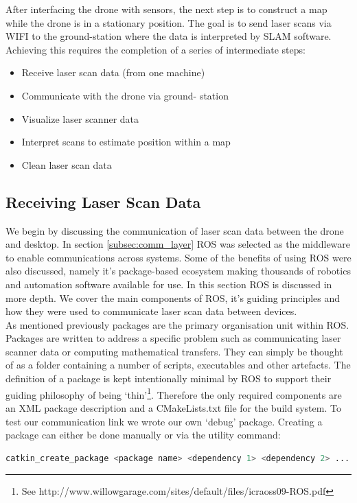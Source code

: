 \documentclass[capstone_report.tex]{subfiles}
\begin{document}
After interfacing the drone with sensors, the next step is to construct a map while the drone is in a stationary position.   The goal is to send laser scans via WIFI to the ground-station where the data is interpreted by SLAM software.  Achieving this requires the completion of a series of intermediate steps:

\begin{itemize}
    \item Receive laser scan data (from one machine)
    \item Communicate with the drone via ground- station
    \item Visualize laser scanner data
    \item Interpret scans to estimate position within a map
    \item Clean laser scan data
\end{itemize}

\subsection{Receiving Laser Scan Data}
We begin by discussing the communication of laser scan data between the drone and desktop.  In section \ref{subsec:comm_layer} ROS was selected as the middleware to enable communications across systems.   Some of the benefits of using ROS were also discussed, namely it’s package-based ecosystem making thousands of robotics and automation software available for use.  In this section ROS is discussed in more depth.  We cover the main components of ROS, it’s guiding principles and how they were used to communicate laser scan data between devices.\\

As mentioned previously packages are the primary organisation unit within ROS.  Packages are written to address a specific problem such as communicating laser scanner data or computing mathematical transfers.  They can simply be thought of as a folder containing a number of scripts, executables and other artefacts. The definition of a package is kept intentionally minimal by ROS to support their guiding philosophy of being ‘thin’\footnote{See http://www.willowgarage.com/sites/default/files/icraoss09-ROS.pdf}.  Therefore the only required components are an XML package description and a CMakeLists.txt file for the build system.  To test our communication link we wrote our own ‘debug’ package. Creating a package can either be done manually or via the utility command:

\begin{lstlisting}[language=bash]
    catkin_create_package <package name> <dependency 1> <dependency 2> ... 
\end{lstlisting}
\end{document}
